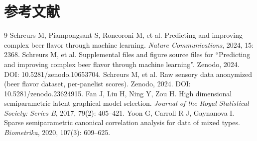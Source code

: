 \section*{参考文献}

\begin{thebibliography}{9}
 Schreurs M, Piampongsant S, Roncoroni M, et al. Predicting and improving complex beer flavor through machine learning. \emph{Nature Communications}, 2024, 15: 2368.
 Schreurs M, et al. Supplemental files and figure source files for ``Predicting and improving complex beer flavor through machine learning''. Zenodo, 2024. DOI: 10.5281/zenodo.10653704.
 Schreurs M, et al. Raw sensory data anonymized (beer flavor dataset, per-panelist scores). Zenodo, 2024. DOI: 10.5281/zenodo.23624915.
 Fan J, Liu H, Ning Y, Zou H. High dimensional semiparametric latent graphical model selection. \emph{Journal of the Royal Statistical Society: Series B}, 2017, 79(2): 405--421.
 Yoon G, Carroll R J, Gaynanova I. Sparse semiparametric canonical correlation analysis for data of mixed types. \emph{Biometrika}, 2020, 107(3): 609--625.
\end{thebibliography}
